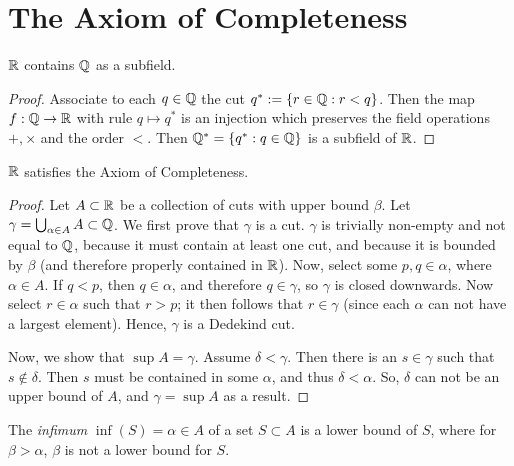\section{The Axiom of Completeness}
\begin{theorem}
	$\mathbb{R}$ contains $\mathbb{Q}$ as a subfield.
\end{theorem}
\begin{proof}
	Associate to each $q\in \mathbb{Q}$ the cut $q^* := \{r\in\mathbb{Q} : r<q\}$. Then the map $f:\mathbb{Q} \to \mathbb{R}$ with rule $q\mapsto q^*$ is an injection which preserves the field operations $+, \times$ and the order $<$. Then $\mathbb{Q}^*=\{q^*:q\in \mathbb{Q}\}$ is a subfield of $\mathbb{R}$.
\end{proof}
\begin{theorem}
	$\mathbb{R}$ satisfies the Axiom of Completeness.
\end{theorem}
\begin{proof}
	Let $A\subset \mathbb{R}$ be a collection of cuts with upper bound $\beta$. Let $\gamma = \bigcup_{\alpha\in A}A\subset \mathbb{Q}$. We first prove that $\gamma$ is a cut. $\gamma$ is trivially non-empty and not equal to $\mathbb{Q}$, because it must contain at least one cut, and because it is bounded by $\beta$ (and therefore properly contained in $\mathbb{R}$). Now, select some $p,q\in\alpha$, where $\alpha\in A$. If $q<p$, then $q\in\alpha$, and therefore $q\in\gamma$, so $\gamma$ is closed downwards. Now select $r\in\alpha$ such that $r>p$; it then follows that $r\in\gamma$ (since each $\alpha$ can not have a largest element). Hence, $\gamma$ is a Dedekind cut. \par
    Now, we show that $\sup A = \gamma$. Assume $\delta < \gamma$. Then there is an $s\in \gamma$ such that $s \not\in \delta$. Then $s$ must be contained in some $\alpha$, and thus $\delta < \alpha$. So, $\delta$ can not be an upper bound of $A$, and $\gamma = \sup A$ as a result.
\end{proof}

\begin{definition}
    The \emph{infimum} $\inf(S)=\alpha\in A$ of a set $S \subset A$ is a lower bound of $S$, where for $\beta > \alpha$, $\beta$ is not a lower bound for $S$.
\end{definition}

